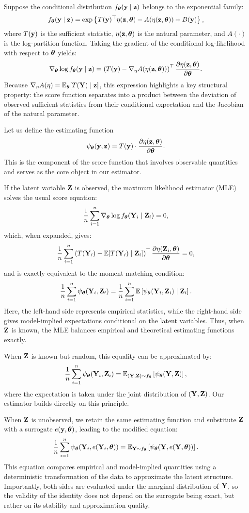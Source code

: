 \documentclass[twoside,11pt]{article}
\begin{document}
Suppose the conditional distribution \( f_{\bm{\theta}}({\bf y} \mid {\bf z}) \) belongs to the exponential family:
\[
f_{\bm{\theta}}({\bf y} \mid {\bf z}) = \exp\left\{ T({\bf y})^\top \eta({\bf z}, {\bm{\theta}}) - A(\eta({\bf z}, {\bm{\theta}})) + B({\bf y}) \right\},
\]
where \( T({\bf y}) \) is the sufficient statistic, \( \eta({\bf z}, {\bm{\theta}}) \) is the natural parameter, and \( A(\cdot) \) is the log-partition function. Taking the gradient of the conditional log-likelihood with respect to \({\bm{\theta}}\) yields:
\[
\nabla_{\bm{\theta}} \log f_{\bm{\theta}}({\bf y} \mid {\bf z}) = \left( T({\bf y}) - \nabla_\eta A(\eta({\bf z}, {\bm{\theta}})) \right)^\top \frac{\partial \eta({\bf z}, {\bm{\theta}})}{\partial {\bm{\theta}}}.
\]
Because \( \nabla_\eta A(\eta) = \mathbb{E}_{\bm{\theta}}[T({\bf Y}) \mid {\bf z}] \), this expression highlights a key structural property: the score function separates into a product between the deviation of observed sufficient statistics from their conditional expectation and the Jacobian of the natural parameter.

Let us define the estimating function
\[
\psi_{\bm{\theta}}({\bf y}, {\bf z}) = T({\bf y}) \cdot \frac{\partial \eta({\bf z}, {\bm{\theta}})}{\partial {\bm{\theta}}}.
\]
This is the component of the score function that involves observable quantities and serves as the core object in our estimator.

If the latent variable \({\bf Z}\) is observed, the maximum likelihood estimator (MLE) solves the usual score equation:
\[
\frac{1}{n} \sum_{i=1}^n \nabla_{\bm{\theta}} \log f_{\bm{\theta}}({\bf Y}_i \mid {\bf Z}_i) = 0,
\]
which, when expanded, gives:
\[
\frac{1}{n} \sum_{i=1}^n \left( T({\bf Y}_i) - \mathbb{E}[T({\bf Y}_i) \mid {\bf Z}_i] \right)^\top \frac{\partial \eta({\bf Z}_i, {\bm{\theta}})}{\partial {\bm{\theta}}} = 0,
\]
and is exactly equivalent to the moment-matching condition:
\[
\frac{1}{n} \sum_{i=1}^n \psi_{\bm{\theta}}({\bf Y}_i, {\bf Z}_i)
=
\frac{1}{n} \sum_{i=1}^n \mathbb{E}\left[ \psi_{\bm{\theta}}({\bf Y}_i, {\bf Z}_i) \mid {\bf Z}_i \right].
\]
Here, the left-hand side represents empirical statistics, while the right-hand side gives model-implied expectations conditional on the latent variables. Thus, when \({\bf Z}\) is known, the MLE balances empirical and theoretical estimating functions exactly.

When \({\bf Z}\) is known but random, this equality can be approximated by:
\[
\frac{1}{n} \sum_{i=1}^n \psi_{\bm{\theta}}({\bf Y}_i, {\bf Z}_i)
= \mathbb{E}_{({\bf Y}, {\bf Z}) \sim f_{\bm{\theta}}}\left[ \psi_{\bm{\theta}}({\bf Y}, {\bf Z}) \right],
\]
where the expectation is taken under the joint distribution of \(({\bf Y}, {\bf Z})\). Our estimator builds directly on this principle.

When \({\bf Z}\) is unobserved, we retain the same estimating function and substitute \({\bf Z}\) with a surrogate \( e({\bf y}, {\bm{\theta}}) \), leading to the modified equation:
\[
\frac{1}{n} \sum_{i=1}^n \psi_{\bm{\theta}}({\bf Y}_i, e({\bf Y}_i, {\bm{\theta}})) 
=
\mathbb{E}_{{\bf Y} \sim f_{\bm{\theta}}} \left[ \psi_{\bm{\theta}}({\bf Y}, e({\bf Y}, {\bm{\theta}})) \right].
\]
This equation compares empirical and model-implied quantities using a deterministic transformation of the data to approximate the latent structure. Importantly, both sides are evaluated under the marginal distribution of \({\bf Y}\), so the validity of the identity does not depend on the surrogate being exact, but rather on its stability and approximation quality.
\end{document}

